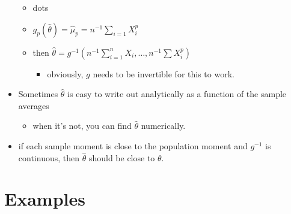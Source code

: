 \begin{itemize}
\begin{itemize}
\item dots
\item $g_p(\hat\theta) = \hat\mu_p = n^{-1}\sum_{i=1} X_i^p$
\item then $\hat\theta = g^{-1}(n^{-1}\sum_{i=1}^n
        X_i,\dots,n^{-1}\sum X_i^p)$
\begin{itemize}
\item obviously, $g$ needs to be invertible for this to work.
\end{itemize}
\end{itemize}
\item Sometimes $\hat\theta$ is easy to write out analytically as a
      function of the sample averages
\begin{itemize}
\item when it's not, you can find $\hat \theta$ numerically.
\end{itemize}
\item if each sample moment is close to the population moment and
      $g^{-1}$ is continuous, then $\hat\theta$ should be close to $\theta$.
\end{itemize}
\section{Examples}
\label{sec-2}

